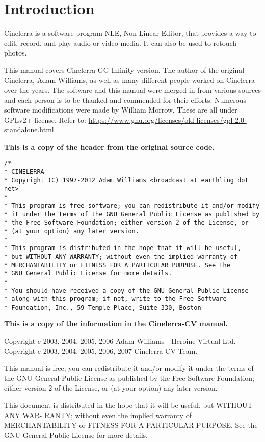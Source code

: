 \chapter{Introduction}%
\label{cha:introduction}

Cinelerra is a software program NLE, Non-Linear Editor, that provides a way to edit, record, and play audio or video media. 
It can also be used to retouch photos.

This manual covers Cinelerra-GG Infinity version. 
The author of the original Cinelerra, Adam Williams, as well as many different people worked on Cinelerra over the years. 
The software and this manual were merged in from various sources and each person is to be thanked and commended for their efforts. 
Numerous software modifications were made by William Morrow. 
These are all under GPLv2+ license. 
Refer to: \url{https://www.gnu.org/licenses/old-licenses/gpl-2.0-standalone.html}


\textbf{This is a copy of the header from the original source code.}
\begin{lstlisting}[numbers=none]
/*
* CINELERRA
* Copyright (C) 1997-2012 Adam Williams <broadcast at earthling dot net>
*
* This program is free software; you can redistribute it and/or modify
* it under the terms of the GNU General Public License as published by
* the Free Software Foundation; either version 2 of the License, or
* (at your option) any later version.
*
* This program is distributed in the hope that it will be useful,
* but WITHOUT ANY WARRANTY; without even the implied warranty of
* MERCHANTABILITY or FITNESS FOR A PARTICULAR PURPOSE. See the
* GNU General Public License for more details.
*
* You should have received a copy of the GNU General Public License
* along with this program; if not, write to the Free Software
* Foundation, Inc., 59 Temple Place, Suite 330, Boston
\end{lstlisting}

\textbf{This is a copy of the information in the Cinelerra-CV manual.}

Copyright c 2003, 2004, 2005, 2006 Adam Williams - Heroine Virtual Ltd.
Copyright c 2003, 2004, 2005, 2006, 2007 Cinelerra CV Team.

This manual is free; you can redistribute it and/or modify it under the terms of the GNU General
Public License as published by the Free Software Foundation; either version 2 of the License, or
(at your option) any later version.

This document is distributed in the hope that it will be useful, but WITHOUT ANY WAR-
RANTY; without even the implied warranty of MERCHANTABILITY or FITNESS FOR A
PARTICULAR PURPOSE. See the GNU General Public License for more details.

